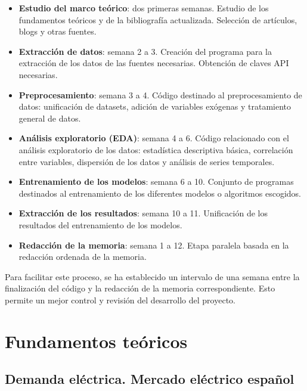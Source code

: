 \documentclass[12pt,a4paper]{report}
\begin{document}
\begin{itemize}
    \item \textbf{Estudio del marco teórico}: dos primeras semanas. Estudio de los fundamentos teóricos y de la bibliografía actualizada. Selección de artículos, blogs y otras fuentes.

    \item \textbf{Extracción de datos}: semana 2 a 3. Creación del programa para la extracción de los datos de las fuentes necesarias. Obtención de claves API necesarias.

    \item \textbf{Preprocesamiento}: semana 3 a 4. Código destinado al preprocesamiento de datos: unificación de datasets, adición de variables exógenas y tratamiento general de datos.

    \item \textbf{Análisis exploratorio (EDA)}: semana 4 a 6. Código relacionado con el análisis exploratorio de los datos: estadística descriptiva básica, correlación entre variables, dispersión de los datos y análisis de series temporales.

    \item \textbf{Entrenamiento de los modelos}: semana 6 a 10. Conjunto de programas destinados al entrenamiento de los diferentes modelos o algoritmos escogidos.

    \item \textbf{Extracción de los resultados}: semana 10 a 11. Unificación de los resultados del entrenamiento de los modelos.

    \item \textbf{Redacción de la memoria}: semana 1 a 12. Etapa paralela basada en la redacción ordenada de la memoria.
\end{itemize}

Para facilitar este proceso, se ha establecido un intervalo de una semana entre la finalización del código y la redacción de la memoria correspondiente. Esto permite un mejor control y revisión del desarrollo del proyecto.

\newpage

\chapter{Fundamentos teóricos}\label{cap:cap3}
\section{Demanda eléctrica. Mercado eléctrico español}
\end{document}
